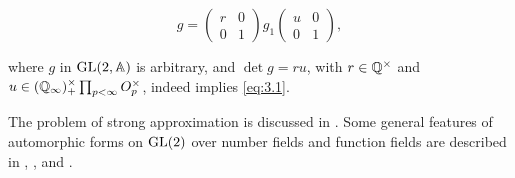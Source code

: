 \[
g = \begin{pmatrix} r & 0 \\ 0 & 1 \end{pmatrix}g_1\begin{pmatrix} u & 0 \\ 0 & 1 \end{pmatrix},
\]

where $g$ in $\operatorname{GL}(2,\mathbb{A})$ is arbitrary, and $\det g = ru$, with $r \in \mathbb{Q}^{\times}$ and $u \in (\mathbb{Q}_\infty)_+^{\times}\prod_{p<\infty}O_p^{\times}$, indeed implies \eqref{eq:3.1}.

The problem of strong approximation is discussed in \cite{Kneser}. Some general features of automorphic forms on $\operatorname{GL}(2)$ over number fields and function fields are described in \cite{JacquetLanglands}, \cite{GodementJacquet}, and \cite{Weil2}.
